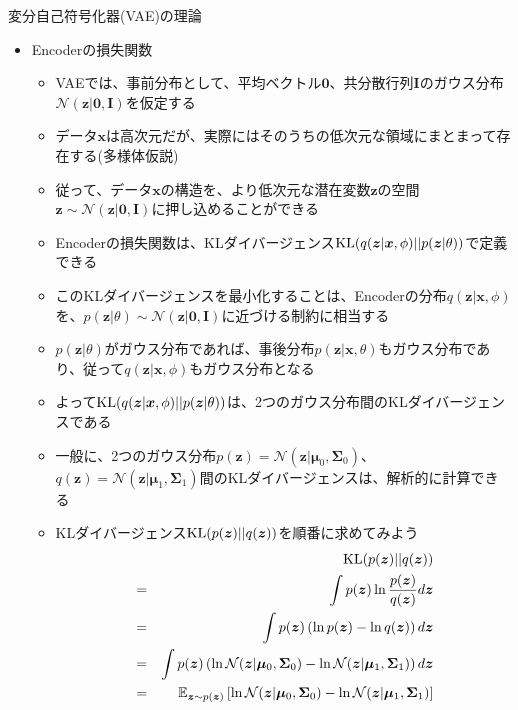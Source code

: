 \documentclass[dvipdfmx,notheorems,t]{beamer}
\begin{document}
\begin{frame}{変分自己符号化器(VAE)の理論}
	
\begin{itemize}	
	\item Encoderの損失関数
	\begin{itemize}
		\item VAEでは、\alert{事前分布として}、平均ベクトル$\bm{0}$、共分散行列$\bm{I}$の\color{red}ガウス分布$\mathcal{N}(\bm{z} | \bm{0}, \bm{I})$を仮定\normalcolor する
		\newline
		\item データ$\bm{x}$は高次元だが、実際にはそのうちの\alert{低次元な領域にまとまって存在}する(\alert{多様体仮説})
		\item 従って、データ$\bm{x}$の構造を、\alert{より低次元な潜在変数$\bm{z}$の空間}$\bm{z} \sim \mathcal{N}(\bm{z} | \bm{0}, \bm{I})$\alert{に押し込める}ことができる
		\newline
		
		\item Encoderの損失関数は、\alert{KLダイバージェンス}$\operatorname{KL}(q(\bm{z} | \bm{x}, \phi) || p(\bm{z} | \theta))$で定義できる
		\item このKLダイバージェンスを最小化することは、Encoderの分布$q(\bm{z} | \bm{x}, \phi)$を、$p(\bm{z} | \theta) \sim \mathcal{N}(\bm{z} | \bm{0}, \bm{I})$に近づける制約に相当する
		\newline
		
		\item $p(\bm{z} | \theta)$がガウス分布であれば、事後分布$p(\bm{z} | \bm{x}, \theta)$もガウス分布であり、従って\color{red}$q(\bm{z} | \bm{x}, \phi)$もガウス分布\normalcolor となる
		\newline
		\item よって$\operatorname{KL}(q(\bm{z} | \bm{x}, \phi) || p(\bm{z} | \theta))$は、2つのガウス分布間のKLダイバージェンスである
		\newline
		
		\item 一般に、2つのガウス分布$p(\bm{z}) = \mathcal{N}(\bm{z} | \bm{\mu}_0, \bm{\Sigma}_0)$、$q(\bm{z}) = \mathcal{N}(\bm{z} | \bm{\mu}_1, \bm{\Sigma}_1)$間のKLダイバージェンスは、解析的に計算できる
		
		\item KLダイバージェンス$\operatorname{KL}(p(\bm{z}) || q(\bm{z}))$を順番に求めてみよう
		\begin{eqnarray}
			&& \operatorname{KL}(p(\bm{z}) || q(\bm{z})) \nonumber \\
			&=& \int p(\bm{z}) \ln \frac{p(\bm{z})}{q(\bm{z})} d\bm{z} \\
			&=& \int p(\bm{z}) \left( \ln p(\bm{z}) - \ln q(\bm{z}) \right) d\bm{z} \\
			&=& \int p(\bm{z}) \left( \ln \mathcal{N}(\bm{z} | \bm{\mu}_0, \bm{\Sigma}_0) - \ln \mathcal{N}(\bm{z} | \bm{\mu}_1, \bm{\Sigma}_1) \right) d\bm{z} \\
			&=& \mathbb{E}_{\bm{z} \sim p(\bm{z})} \left[ \ln \mathcal{N}(\bm{z} | \bm{\mu}_0, \bm{\Sigma}_0) - \ln \mathcal{N}(\bm{z} | \bm{\mu}_1, \bm{\Sigma}_1) \right]
		\end{eqnarray}
		

\end{itemize}
\end{itemize}
\end{frame}
\end{document}
